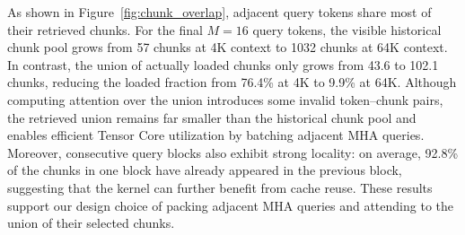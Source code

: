 As shown in Figure~\ref{fig:chunk_overlap}, adjacent query tokens share most of their retrieved chunks. For the final $M=16$ query tokens, the visible historical chunk pool grows from 57 chunks at 4K context to 1032 chunks at 64K context. In contrast, the union of actually loaded chunks only grows from 43.6 to 102.1 chunks, reducing the loaded fraction from 76.4\% at 4K to 9.9\% at 64K. Although computing attention over the union introduces some invalid token--chunk pairs, the retrieved union remains far smaller than the historical chunk pool and enables efficient Tensor Core utilization by batching adjacent MHA queries. Moreover, consecutive query blocks also exhibit strong locality: on average, 92.8\% of the chunks in one block have already appeared in the previous block, suggesting that the kernel can further benefit from cache reuse. These results support our design choice of packing adjacent MHA queries and attending to the union of their selected chunks.

% 









